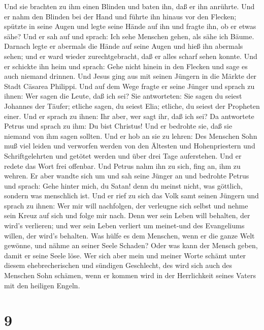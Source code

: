 Und sie brachten zu ihm einen Blinden und baten ihn, daß er ihn
anrührte.  Und er nahm den Blinden bei der Hand und führte
ihn hinaus vor den Flecken; spützte in seine Augen und legte seine Hände
auf ihn und fragte ihn, ob er etwas sähe?  Und er sah auf
und sprach: Ich sehe Menschen gehen, als sähe ich Bäume. 
Darnach legte er abermals die Hände auf seine Augen und hieß ihn
abermals sehen; und er ward wieder zurechtgebracht, daß er alles scharf
sehen konnte.  Und er schickte ihn heim und sprach: Gehe
nicht hinein in den Flecken und sage es auch niemand drinnen.
 Und Jesus ging aus mit seinen Jüngern in die Märkte der
Stadt Cäsarea Philippi. Und auf dem Wege fragte er seine Jünger und
sprach zu ihnen: Wer sagen die Leute, daß ich sei?  Sie
antworteten: Sie sagen du seiest Johannes der Täufer; etliche sagen, du
seiest Elia; etliche, du seiest der Propheten einer.  Und
er sprach zu ihnen: Ihr aber, wer sagt ihr, daß ich sei? Da antwortete
Petrus und sprach zu ihm: Du bist Christus!  Und er
bedrohte sie, daß sie niemand von ihm sagen sollten.  Und
er hob an sie zu lehren: Des Menschen Sohn muß viel leiden und verworfen
werden von den Ältesten und Hohenpriestern und Schriftgelehrten und
getötet werden und über drei Tage auferstehen.  Und er
redete das Wort frei offenbar. Und Petrus nahm ihn zu sich, fing an, ihm
zu wehren.  Er aber wandte sich um und sah seine Jünger an
und bedrohte Petrus und sprach: Gehe hinter mich, du Satan! denn du
meinst nicht, was göttlich, sondern was menschlich ist. 
Und er rief zu sich das Volk samt seinen Jüngern und sprach zu ihnen:
Wer mir will nachfolgen, der verleugne sich selbst und nehme sein Kreuz
auf sich und folge mir nach.  Denn wer sein Leben will
behalten, der wird's verlieren; und wer sein Leben verliert um
meinet-und des Evangeliums willen, der wird's behalten. 
Was hülfe es dem Menschen, wenn er die ganze Welt gewönne, und nähme an
seiner Seele Schaden?  Oder was kann der Mensch geben,
damit er seine Seele löse.  Wer sich aber mein und meiner
Worte schämt unter diesem ehebrecherischen und sündigen Geschlecht, des
wird sich auch des Menschen Sohn schämen, wenn er kommen wird in der
Herrlichkeit seines Vaters mit den heiligen Engeln.

\hypertarget{section-8}{%
\section{9}\label{section-8}}

